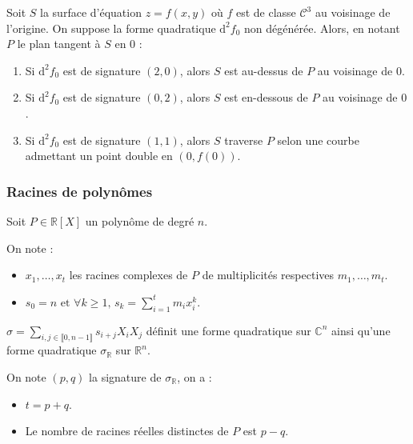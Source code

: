 	\begin{application}
		Soit $S$ la surface d'équation $z = f(x, y)$ où $f$ est de classe $\mathcal{C}^3$ au voisinage de l'origine. On suppose la forme quadratique $\mathrm{d}^2 f_0$ non dégénérée. Alors, en notant $P$ le plan tangent à $S$ en $0$ :
		\begin{enumerate}[label=(\roman*)]
			\item Si $\mathrm{d}^2 f_0$ est de signature $(2, 0)$, alors $S$ est au-dessus de $P$ au voisinage de $0$.
			\item Si $\mathrm{d}^2 f_0$ est de signature $(0, 2)$, alors $S$ est en-dessous de $P$ au voisinage de $0$.
			\item Si $\mathrm{d}^2 f_0$ est de signature $(1, 1)$, alors $S$ traverse $P$ selon une courbe admettant un point double en $(0, f(0))$.
		\end{enumerate}
	\end{application}
	
	\subsubsection{Racines de polynômes}
	
	
	Soit $P \in \mathbb{R}[X]$ un polynôme de degré $n$.
	
	\begin{notation}
		On note :
		\begin{itemize}
			\item $x_1, \dots, x_t$ les racines complexes de $P$ de multiplicités respectives $m_1, \dots, m_t$.
			\item $s_0 = n \text{ et } \forall k \geq 1, \, s_k = \sum_{i=1}^t m_i x_i^k$.
		\end{itemize}
	\end{notation}
	
	\begin{proposition}
		$\sigma = \sum_{i, j \in \llbracket 0, n-1 \rrbracket} s_{i+j} X_i X_j$ définit une forme quadratique sur $\mathbb{C}^n$ ainsi qu'une forme quadratique $\sigma_{\mathbb{R}}$ sur $\mathbb{R}^n$.
	\end{proposition}
	
	
	\begin{theorem}
		On note $(p,q)$ la signature de $\sigma_{\mathbb{R}}$, on a :
		\begin{itemize}
			\item $t = p + q$.
			\item Le nombre de racines réelles distinctes de $P$ est $p-q$.
		\end{itemize}
	\end{theorem}
	
